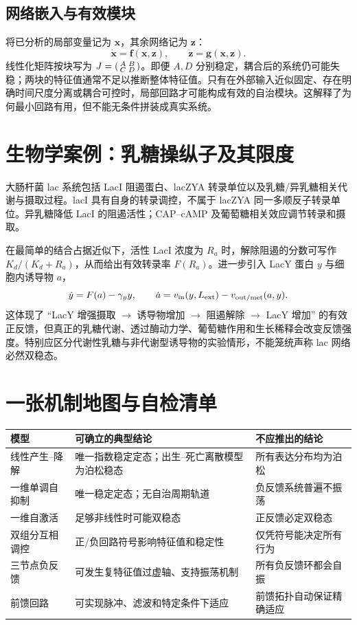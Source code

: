 \documentclass[11pt,a4paper,UTF8]{ctexart}
\begin{document}
\subsection{网络嵌入与有效模块}
将已分析的局部变量记为 $\bm x$，其余网络记为 $\bm z$：
\begin{equation}\dot{\bm x}=\bm f(\bm x,\bm z),\qquad\dot{\bm z}=\bm g(\bm x,\bm z).\end{equation}
线性化矩阵按块写为 $J=\begin{psmallmatrix}A&B\\C&D\end{psmallmatrix}$。即便 $A,D$ 分别稳定，耦合后的系统仍可能失稳；两块的特征值通常不足以推断整体特征值。只有在外部输入近似固定、存在明确时间尺度分离或耦合可控时，局部回路才可能构成有效的自治模块。这解释了为何最小回路有用，但不能无条件拼装成真实系统。

\section{生物学案例：乳糖操纵子及其限度}
大肠杆菌 lac 系统包括 LacI 阻遏蛋白、lacZYA 转录单位以及乳糖/异乳糖相关代谢与摄取过程。lacI 具有自身的转录调控，不属于 lacZYA 同一多顺反子转录单位。异乳糖降低 LacI 的阻遏活性；CAP--cAMP 及葡萄糖相关效应调节转录和摄取。

在最简单的结合占据近似下，活性 LacI 浓度为 $R_a$ 时，解除阻遏的分数可写作 $K_d/(K_d+R_a)$，从而给出有效转录率 $F(R_a)$。进一步引入 LacY 蛋白 $y$ 与细胞内诱导物 $a$，
\begin{equation}\dot y=F(a)-\gamma_y y,\qquad\dot a=v_{\rm in}(y,L_{\rm ext})-v_{\rm out/met}(a,y).\end{equation}
这体现了 ``LacY 增强摄取 $\to$ 诱导物增加 $\to$ 阻遏解除 $\to$ LacY 增加'' 的有效正反馈，但真正的乳糖代谢、透过酶动力学、葡萄糖作用和生长稀释会改变反馈强度。特别应区分代谢性乳糖与非代谢型诱导物的实验情形，不能笼统声称 lac 网络必然双稳态。

\section{一张机制地图与自检清单}
\begin{center}\begin{tabular}{p{2.9cm}p{5.6cm}p{4.2cm}}\toprule
模型 & 可确立的典型结论 & 不应推出的结论\\\midrule
线性产生--降解 & 唯一指数稳定定态；出生--死亡离散模型为泊松稳态 & 所有表达分布均为泊松\\
一维单调自抑制 & 唯一稳定定态；无自治周期轨道 & 负反馈系统普遍不振荡\\
一维自激活 & 足够非线性时可能双稳态 & 正反馈必定双稳态\\
双组分互相调控 & 正/负回路符号影响特征值和稳定性 & 仅凭符号能决定所有行为\\
三节点负反馈 & 可发生复特征值过虚轴、支持振荡机制 & 所有负反馈环都会自振\\
前馈回路 & 可实现脉冲、滤波和特定条件下适应 & 前馈拓扑自动保证精确适应\\
\bottomrule\end{tabular}\end{center}
\end{document}
